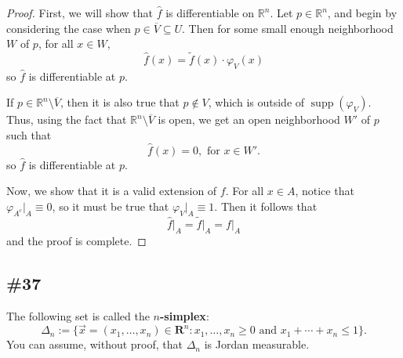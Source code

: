 \documentclass{article}
\newcommand{\R}{\mathbf{R}}
\newcommand{\cl}[1]{\overline{#1}}
\theoremstyle{plain} %
\numberwithin{thm}{section} %
\theoremstyle{definition}
\begin{document}
\begin{proof}
            First, we will show that \(\widehat{f}\) is differentiable on \(\mathbb{R}^n\). Let \(p \in \mathbb{R}^n\), and begin by considering the case when \(p \in \cl{V} \subseteq U\). Then for some small enough neighborhood \(W\) of \(p\), for all \(x \in W\),
            \[
                \widehat{f}(x) = \widetilde{f} (x) \cdot \varphi_V (x)
            \]
            so \(\widehat{f}\) is differentiable at \(p\).
    
            If \(p \in \mathbb{R}^n \setminus \cl{V}\), then it is also true that \(p \notin V\), which is outside of \(\mathop{\mathrm{supp}}(\varphi_V)\). Thus, using the fact that \(\mathbb{R}^n \setminus \cl{V}\) is open, we get an open neighborhood \(W'\) of \(p\) such that
            \[
                \widehat{f}(x) = 0, \text{ for } x \in W'.
            \]
            so \(\widehat{f}\) is differentiable at \(p\).
    
            Now, we show that it is a valid extension of \(f\). For all \(x \in A\), notice that \(\varphi_{A^c} \vert _A \equiv 0\), so it must be true that \(\varphi _V \vert _A \equiv 1\). Then it follows that
            \[
                \widehat{f} \vert _A = \widetilde{f}\vert _A = f \vert _A
            \]
            and the proof is complete.    
        \end{proof}
        \newpage
        \subsection{\#37}
        The following set is called the \textbf{$n$-simplex}:
        \[ \Delta_n := \{ \vec{x}=(x_1,\ldots,x_n)\in \R^n : x_1,\ldots,x_n\geq 0 \text{ and } x_1+\cdots+x_n\leq 1\}. \]
        You can assume, without proof, that $\Delta_n$ is Jordan measurable.
        
\end{document}
